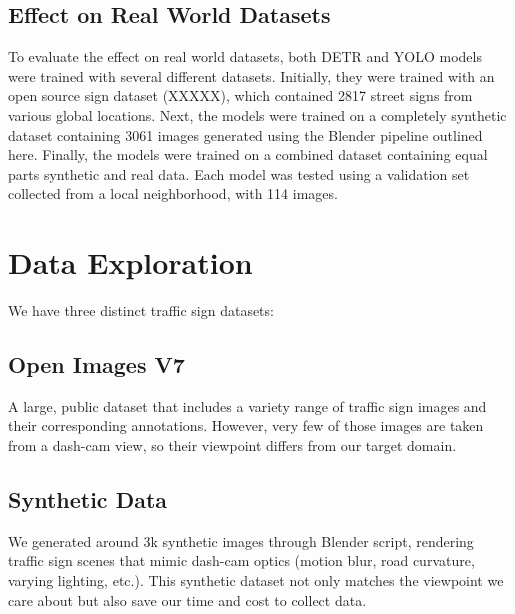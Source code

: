 \documentclass[journal]{IEEEtran}
\begin{document}
\subsection{Effect on Real World Datasets}
To evaluate the effect on real world datasets, both DETR \cite{DETR} and YOLO\cite{glenn_jocher_2022_7347926} models were trained with several different datasets. Initially, they were trained with an open source sign dataset (XXXXX), which contained 2817 street signs from various global locations. Next, the models were trained on a completely synthetic dataset containing 3061 images generated using the Blender pipeline outlined here. Finally, the models were trained on a combined dataset containing equal parts synthetic and real data. Each model was tested using a validation set collected from a local neighborhood, with 114 images. 

\section{Data Exploration}
We have three distinct traffic sign datasets:

\subsection{Open Images V7}
A large, public dataset that includes a variety range of traffic sign images and their corresponding annotations. However, very few of those images are taken from a dash-cam view, so their viewpoint differs from our target domain.

\subsection{Synthetic Data}
We generated around 3k synthetic images through Blender script, rendering traffic sign scenes that mimic dash-cam optics (motion blur, road curvature, varying lighting, etc.). This synthetic dataset not only matches the viewpoint we care about but also save our time and cost to collect data.
\end{document}
